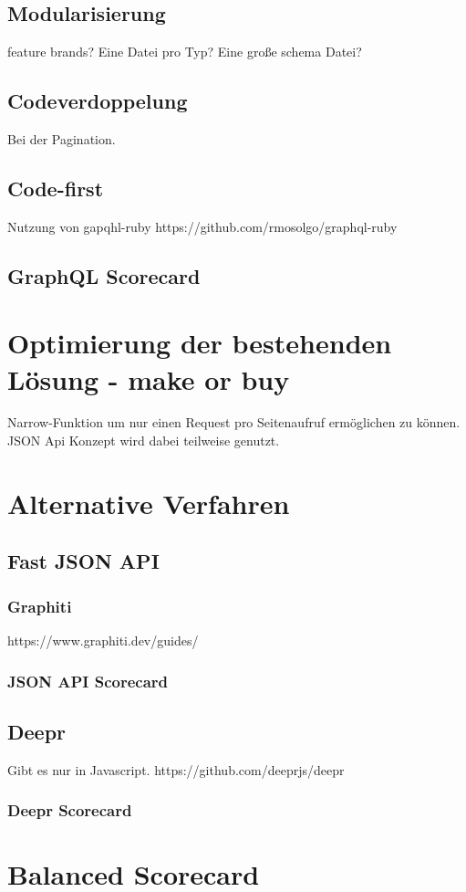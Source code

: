 \subsection{Modularisierung}
feature brands?
Eine Datei pro Typ?
Eine große schema Datei?
\subsection{Codeverdoppelung}
Bei der Pagination.
\subsection{Code-first}
Nutzung von gapqhl-ruby
https://github.com/rmosolgo/graphql-ruby
\subsection{GraphQL Scorecard}
\section{Optimierung der bestehenden Lösung - make or buy}
Narrow-Funktion um nur einen Request pro Seitenaufruf ermöglichen zu können. JSON Api Konzept wird dabei teilweise genutzt.
\section{Alternative Verfahren}
\subsection{Fast JSON API}
\subsubsection{Graphiti}
https://www.graphiti.dev/guides/
\subsubsection{JSON API Scorecard}
\subsection{Deepr}
Gibt es nur in Javascript.
https://github.com/deeprjs/deepr
\subsubsection{Deepr Scorecard}
\section{Balanced Scorecard}
